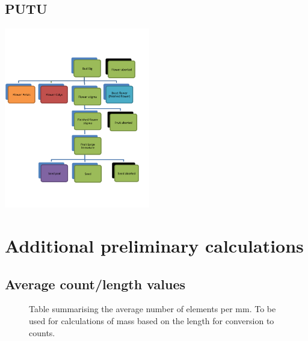 \documentclass[10pt]{book} %
\begin{document}
\clearpage
\newpage
\section{PUTU}
\begin{multicols}{2}
\includegraphics[width=2.5in]{images/PUTU.png}
\vfill
\columnbreak

\end{multicols}




\chapter{Additional preliminary calculations}

\section{Average count/length values}


\begin{figure}[h!]
\begin{center}

\end{center}
\caption{Table summarising the average number of elements per mm. To be used for calculations of mass based on the length for conversion to counts.}
\end{figure}


\end{document}
